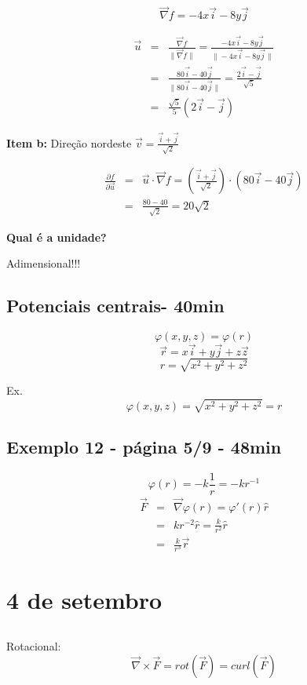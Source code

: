 \documentclass[a4paper,10pt]{book}
\begin{document}
$$\vec{\nabla}f = -4x\vec{i} -8y\vec{j}$$

\begin{eqnarray*}\vec{u}&=&\frac{\vec{\nabla}f}{\|\vec{\nabla}f\|}=\frac{-4x\vec{i} -8y\vec{j}}{\|-4x\vec{i} -8y\vec{j}\|}\\
&=&\frac{80\vec{i} -40\vec{j}}{\|80\vec{i} -40\vec{j}\|}= \frac{2\vec{i}-\vec{j}}{\sqrt{5}}\\
&=&\frac{\sqrt{5}}{5}\left(2\vec{i}-\vec{j}\right)
\end{eqnarray*}


{\bf Item b:} Direção nordeste $\vec{v}=\frac{\vec{i}+\vec{j}}{\sqrt{2}}$


\begin{eqnarray*}\frac{\partial f}{\partial \vec{u}}&=&\vec{u}\cdot\vec{\nabla}f=\left(\frac{\vec{i}+\vec{j}}{\sqrt{2}}\right)\cdot\left(80\vec{i}-40\vec{j}\right)\\
&=&\frac{80-40}{\sqrt{2}}=20\sqrt{2}
\end{eqnarray*}
\begin{center}{\bf \huge Qual é a unidade?}\end{center}
Adimensional!!!


\section{Potenciais centrais- 40min}
$$\varphi(x,y,z) = \varphi(r)$$
$$\vec{r}=x\vec{i}+y\vec{j}+z\vec{z}$$
$${r}=\sqrt{x^2+y^2+z^2}$$

Ex.
$$\varphi(x,y,z) = \sqrt{x^2+y^2+z^2}=r$$

\section{Exemplo 12 - página 5/9 - 48min}

$$\varphi(r)=-k\frac{1}{r}=-kr^{-1}$$
\begin{eqnarray*}\vec{F}&=&\vec{\nabla}\varphi(r)=\varphi'(r)\hat{r}\\
&=&kr^{-2}\hat{r}= \frac{k}{r^2}\hat{r}\\&=&\frac{k}{r^3}\vec{r}
\end{eqnarray*}


\chapter{4 de setembro}
\section{}
Rotacional:
$$\vec{\nabla}\times\vec{F}=rot(\vec{F})=curl(\vec{F})$$
\end{document}
